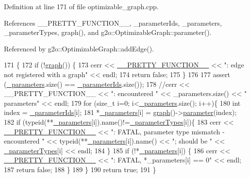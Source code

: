 Definition at line 171 of file optimizable\+\_\+graph.\+cpp.



References \+\_\+\+\_\+\+P\+R\+E\+T\+T\+Y\+\_\+\+F\+U\+N\+C\+T\+I\+O\+N\+\_\+\+\_\+, \+\_\+parameter\+Ids, \+\_\+parameters, \+\_\+parameter\+Types, graph(), and g2o\+::\+Optimizable\+Graph\+::parameter().



Referenced by g2o\+::\+Optimizable\+Graph\+::add\+Edge().


\begin{DoxyCode}
171                                                \{
172     \textcolor{keywordflow}{if} (!\hyperlink{classg2o_1_1OptimizableGraph_1_1Edge_a3684190bf8e99f39f58ffadd0dfa6b05}{graph}()) \{
173       cerr << \hyperlink{macros_8h_a9c15fe1e91b07ea3280f5239f9841b67}{\_\_PRETTY\_FUNCTION\_\_} << \textcolor{stringliteral}{": edge not registered with a graph"} << endl;
174       \textcolor{keywordflow}{return} \textcolor{keyword}{false};
175     \}
176     
177     assert (\hyperlink{classg2o_1_1OptimizableGraph_1_1Edge_a41c4d6a404d0b057d37fac43edec40ed}{\_parameters}.size() == \hyperlink{classg2o_1_1OptimizableGraph_1_1Edge_a33a35663ba5b096cb6e6078014bd6f17}{\_parameterIds}.size());
178     \textcolor{comment}{//cerr << \_\_PRETTY\_FUNCTION\_\_ << ": encountered " << \_parameters.size() << " parameters" << endl;}
179     \textcolor{keywordflow}{for} (\textcolor{keywordtype}{size\_t} i=0; i<\hyperlink{classg2o_1_1OptimizableGraph_1_1Edge_a41c4d6a404d0b057d37fac43edec40ed}{\_parameters}.size(); i++)\{
180       \textcolor{keywordtype}{int} index = \hyperlink{classg2o_1_1OptimizableGraph_1_1Edge_a33a35663ba5b096cb6e6078014bd6f17}{\_parameterIds}[i];
181       *\hyperlink{classg2o_1_1OptimizableGraph_1_1Edge_a41c4d6a404d0b057d37fac43edec40ed}{\_parameters}[i] = \hyperlink{classg2o_1_1OptimizableGraph_1_1Edge_a3684190bf8e99f39f58ffadd0dfa6b05}{graph}()->\hyperlink{structg2o_1_1OptimizableGraph_ad9506880a9289353ddd2277fafb76ffd}{parameter}(index);
182       \textcolor{keywordflow}{if} (\textcolor{keyword}{typeid}(**\hyperlink{classg2o_1_1OptimizableGraph_1_1Edge_a41c4d6a404d0b057d37fac43edec40ed}{\_parameters}[i]).name()!=\hyperlink{classg2o_1_1OptimizableGraph_1_1Edge_a08666609850240956c64c95ae5ae0f2c}{\_parameterTypes}[i])\{
183         cerr << \hyperlink{macros_8h_a9c15fe1e91b07ea3280f5239f9841b67}{\_\_PRETTY\_FUNCTION\_\_} << \textcolor{stringliteral}{": FATAL, parameter type mismatch - encountered "}
       << \textcolor{keyword}{typeid}(**\hyperlink{classg2o_1_1OptimizableGraph_1_1Edge_a41c4d6a404d0b057d37fac43edec40ed}{\_parameters}[i]).name() << \textcolor{stringliteral}{"; should be "} << 
      \hyperlink{classg2o_1_1OptimizableGraph_1_1Edge_a08666609850240956c64c95ae5ae0f2c}{\_parameterTypes}[i] << endl;
184       \}
185       \textcolor{keywordflow}{if} (!*\hyperlink{classg2o_1_1OptimizableGraph_1_1Edge_a41c4d6a404d0b057d37fac43edec40ed}{\_parameters}[i]) \{
186         cerr << \hyperlink{macros_8h_a9c15fe1e91b07ea3280f5239f9841b67}{\_\_PRETTY\_FUNCTION\_\_} << \textcolor{stringliteral}{": FATAL, *\_parameters[i] == 0"} << endl;
187         \textcolor{keywordflow}{return} \textcolor{keyword}{false};
188       \}
189     \}
190     \textcolor{keywordflow}{return} \textcolor{keyword}{true};
191   \}
\end{DoxyCode}
